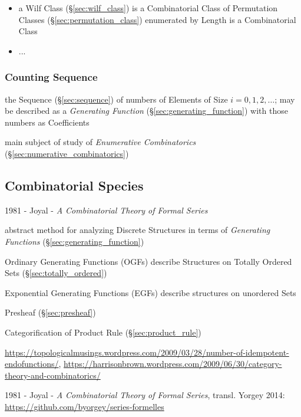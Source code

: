 \begin{itemize}
  \item a Wilf Class (\S\ref{sec:wilf_class}) is a Combinatorial Class of
    Permutation Classes (\S\ref{sec:permutation_class}) enumerated by Length is
    a Combinatorial Class
  \item ...
\end{itemize}



\subsubsection{Counting Sequence}\label{sec:counting_sequence}

the Sequence (\S\ref{sec:sequence}) of numbers of Elements of Size $i = 0, 1, 2,
\ldots$; may be described as a \emph{Generating Function}
(\S\ref{sec:generating_function}) with those numbers as Coefficients

main subject of study of \emph{Enumerative Combinatorics}
(\S\ref{sec:numerative_combinatorics})



\subsection{Combinatorial Species}\label{sec:combinatorial_species}

1981 - Joyal - \emph{A Combinatorial Theory of Formal Series}

abstract method for analyzing Discrete Structures in terms of \emph{Generating
  Functions} (\S\ref{sec:generating_function})

Ordinary Generating Functions (OGFs) describe Structures on Totally Ordered Sets
(\S\ref{sec:totally_ordered})

Exponential Generating Functions (EGFs) describe structures on unordered Sets

Presheaf (\S\ref{sec:presheaf})

Categorification of Product Rule (\S\ref{sec:product_rule}) %

\url{https://topologicalmusings.wordpress.com/2009/03/28/number-of-idempotent-endofunctions/},
\url{https://harrisonbrown.wordpress.com/2009/06/30/category-theory-and-combinatorics/}

1981 - Joyal - \emph{A Combinatorial Theory of Formal Series}, transl. Yorgey
2014: \url{https://github.com/byorgey/series-formelles}


